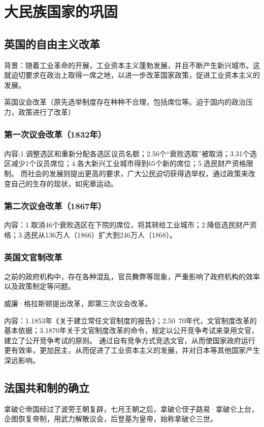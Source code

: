 \section{大民族国家的巩固}

\subsection{英国的自由主义改革}
背景：随着工业革命的开展，工业资本主义蓬勃发展，并且不断产生新兴城市。这就迫切要求在政治上取得一席之地，以进一步改革国家政策，促进工业资本主义的发展。

英国议会改革（原先选举制度存在种种不合理，包括席位等。迫于国内的政治压力，政策进行了改革）

\subsubsection{第一次议会改革（1832年）}
内容;1.调整选区和重新分配各选区议员名额；2.56个“衰败选取”被取消；3.31个选区减少1个议员席位；4.各大新兴工业城市得到65个新的席位；5.选民财产资格限制。
而社会的发展则提出更高的要求，广大公民迫切获得选举权，通过政策来改变自己的生存的现状，如宪章运动。

\subsubsection{第二次议会改革（1867年）}
内容：1.取消46个衰败选区在下院的席位，将其转给工业城市；2.降低选民财产资格；3.选民从136万人（1866）扩大到246万人（1868）。

\subsubsection{英国文官制改革}
之前的政府机构中，存在各种混乱，官员舞弊等现象，严重影响了政府机构的效率以及政策制定等问题。

威廉·格拉斯顿提出改革，即第三次议会改革。

内容：1.1853年《关于建立常任文官制度的报告》；2.50~70年代，文官制度改革的基本依据；3.1870年关于文官制度改革的命令，规定以公开竞争考试来录用文官，建立了公开竞争考试的原则。
通过自有竞争方式竞选文官，从而使国家政府运行更有效率，更加民主，从而促进了工业资本主义的发展，并对日本等其他国家产生深远影响。


\subsection{法国共和制的确立}
拿破仑帝国经过了波旁王朝复辟，七月王朝之后，拿破仑侄子路易·拿破仑上台，企图恢复帝制，用武力解散议会，后登基为皇帝，始称拿破仑三世。

